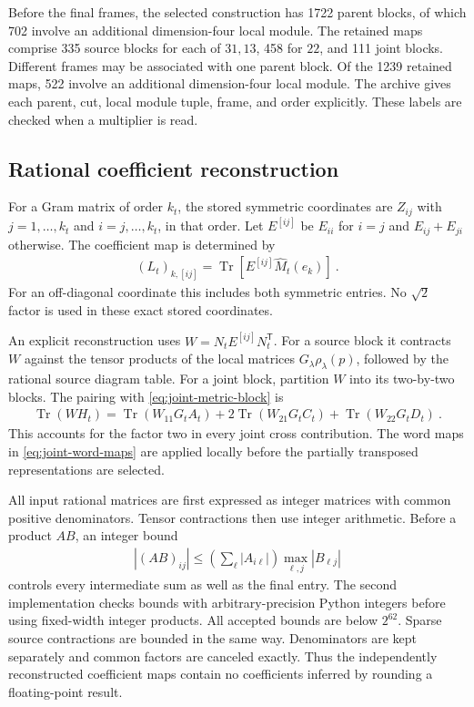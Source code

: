 \documentclass[aps,pra,reprint,superscriptaddress,amsmath,amssymb,floatfix,nofootinbib]{revtex4-2}
\newcommand{\Tr}{\operatorname{Tr}}
\begin{document}
Before the final frames, the selected construction has 1722 parent
blocks, of which 702 involve an additional dimension-four local module.
The retained maps comprise 335 source blocks for each of $31,13$, 458
for $22$, and 111 joint blocks. Different frames may be associated with
one parent block. Of the 1239 retained maps, 522 involve an additional
dimension-four local module.
The archive gives each parent, cut, local module tuple, frame, and order
explicitly. These labels are checked when a multiplier is read.

\subsection{Rational coefficient reconstruction}

For a Gram matrix of order $k_t$, the stored symmetric coordinates are
$Z_{ij}$ with $j=1,\ldots,k_t$ and $i=j,\ldots,k_t$, in that order.
Let $E^{[ij]}$ be $E_{ii}$ for $i=j$ and $E_{ij}+E_{ji}$ otherwise.
The coefficient map is determined by
\begin{align}
 (L_t)_{k,[ij]}
 =\Tr\!\left[E^{[ij]}\widehat M_t(e_k)\right]\ .
 \label{eq:gram-coefficients}
\end{align}
For an off-diagonal coordinate this includes both symmetric entries.
No $\sqrt2$ factor is used in these exact stored coordinates.

An explicit reconstruction uses $W=N_tE^{[ij]}N_t^{\mathsf T}$.
For a source block it contracts $W$ against the tensor products of the
local matrices $G_\lambda\rho_\lambda(p)$, followed by the rational
source diagram table.
For a joint block, partition $W$ into its two-by-two blocks. The pairing
with \cref{eq:joint-metric-block} is
\begin{align}
 \Tr(W H_t)
 =\Tr(W_{11}G_tA_t)
  +2\Tr(W_{21}G_tC_t)
  +\Tr(W_{22}G_tD_t)\ .
 \label{eq:joint-coefficient-pairing}
\end{align}
This accounts for the factor two in every joint cross contribution.
The word maps in \cref{eq:joint-word-maps} are applied locally before the
partially transposed representations are selected.

All input rational matrices are first expressed as integer matrices with
common positive denominators. Tensor contractions then use integer
arithmetic. Before a product $AB$, an integer bound
\begin{align}
 |(AB)_{ij}|
 \leq \left(\sum_\ell|A_{i\ell}|\right)
           \max_{\ell,j}|B_{\ell j}|
 \label{eq:integer-bound}
\end{align}
controls every intermediate sum as well as the final entry.
The second implementation checks bounds with arbitrary-precision Python
integers before using fixed-width integer products. All accepted bounds
are below $2^{62}$.
Sparse source contractions are bounded in the same way.
Denominators are kept separately and common factors are canceled exactly.
Thus the independently reconstructed coefficient maps contain no
coefficients inferred by rounding a floating-point result.
\end{document}
